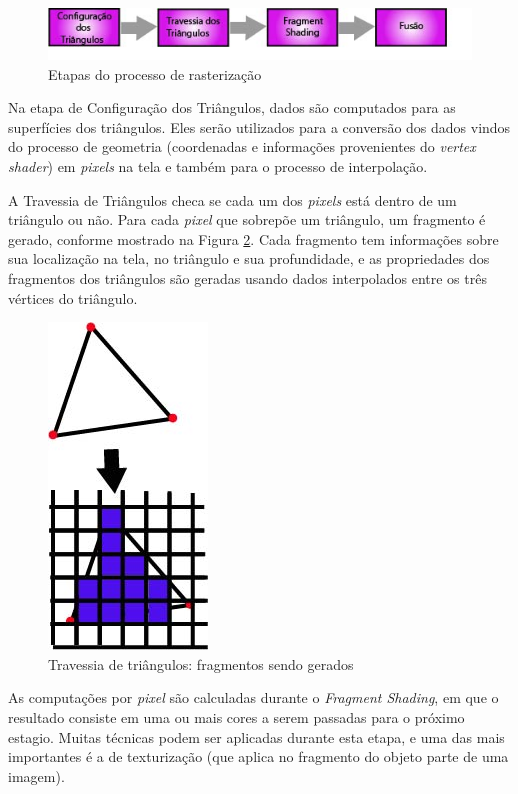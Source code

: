    \begin{figure}[h]
       \centering
	\includegraphics[keepaspectratio=true,scale=0.8]{figuras/rasteriza.jpg}
       \caption{Etapas do processo de rasterização}
       \label{rasteriza}
       \end{figure}

	Na etapa de Configuração dos Triângulos, dados são computados para as superfícies dos triângulos. Eles serão utilizados para a conversão dos dados vindos do processo de geometria (coordenadas e informações provenientes do \textit{vertex shader}) em \textit{pixels} na tela e também para o processo de interpolação. 

	A Travessia de Triângulos checa se cada um dos \textit{pixels} está dentro de um triângulo ou não. Para cada \textit{pixel} que sobrepõe um triângulo, um fragmento é gerado, conforme mostrado na Figura \ref{traversal}. Cada fragmento tem informações sobre sua localização na tela, no triângulo e sua profundidade, e as propriedades dos fragmentos dos triângulos são geradas usando dados interpolados entre os três vértices do triângulo. 

  \begin{figure}[h]
       \centering
	\includegraphics[keepaspectratio=true,scale=0.8]{figuras/traversal.jpg}
       \caption{Travessia de triângulos: fragmentos sendo gerados}
       \label{traversal}
       \end{figure}

	As computações por \textit{pixel} são calculadas durante o \textit{Fragment Shading}, em que o resultado consiste em uma ou mais cores a serem passadas para o próximo estagio. Muitas técnicas podem ser aplicadas durante esta etapa, e uma das mais importantes é a de texturização (que aplica no fragmento do objeto parte de uma imagem). 

